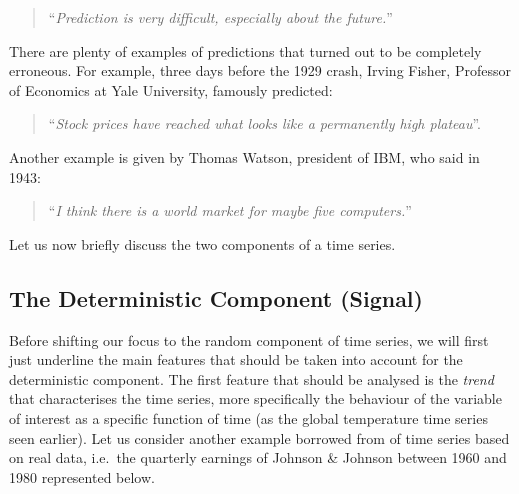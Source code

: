 \documentclass[]{book}
\newenvironment{Shaded}{\begin{snugshade}}{\end{snugshade}}
\newcommand{\CommentTok}[1]{\textcolor[rgb]{0.56,0.35,0.01}{\textit{#1}}}
\newcommand{\DataTypeTok}[1]{\textcolor[rgb]{0.13,0.29,0.53}{#1}}
\newcommand{\DecValTok}[1]{\textcolor[rgb]{0.00,0.00,0.81}{#1}}
\newcommand{\KeywordTok}[1]{\textcolor[rgb]{0.13,0.29,0.53}{\textbf{#1}}}
\newcommand{\NormalTok}[1]{#1}
\newcommand{\StringTok}[1]{\textcolor[rgb]{0.31,0.60,0.02}{#1}}
\theoremstyle{definition}
\theoremstyle{definition}
\theoremstyle{definition}
\theoremstyle{remark}
\begin{document}
\begin{quote}
``\emph{Prediction is very difficult, especially about the future.}''
\end{quote}

There are plenty of examples of predictions that turned out to be
completely erroneous. For example, three days before the 1929 crash,
Irving Fisher, Professor of Economics at Yale University, famously
predicted:

\begin{quote}
``\emph{Stock prices have reached what looks like a permanently high
plateau}''.
\end{quote}

Another example is given by Thomas Watson, president of IBM, who said in
1943:

\begin{quote}
``\emph{I think there is a world market for maybe five computers.}''
\end{quote}

Let us now briefly discuss the two components of a time series.

\hypertarget{the-deterministic-component-signal}{%
\subsection{The Deterministic Component
(Signal)}\label{the-deterministic-component-signal}}

Before shifting our focus to the random component of time series, we
will first just underline the main features that should be taken into
account for the deterministic component. The first feature that should
be analysed is the \emph{trend} that characterises the time series, more
specifically the behaviour of the variable of interest as a specific
function of time (as the global temperature time series seen earlier).
Let us consider another example borrowed from \citet{shumway2010time} of
time series based on real data, i.e.~the quarterly earnings of Johnson
\& Johnson between 1960 and 1980 represented below.

\begin{Shaded}
\end{Shaded}
\end{document}
